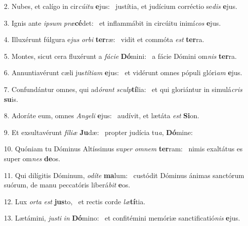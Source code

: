 2. Nubes, et calígo in cir\textit{cú}\textit{i}\textit{tu} \textbf{e}jus: \ast\  justítia, et judícium corréctio se\textit{dis} \textbf{e}jus.\

3. Ignis ante \textit{ip}\textit{sum} \textit{præ}\textbf{cé}det: \ast\  et inflammábit in circúitu inimí\textit{cos} \textbf{e}jus.\

4. Illuxérunt fúlgura e\textit{jus} \textit{or}\textit{bi} \textbf{ter}ræ: \ast\  vidit et commóta \textit{est} \textbf{ter}ra.\

5. Montes, sicut cera fluxérunt a \textit{fá}\textit{ci}\textit{e} \textbf{Dó}mini: \ast\  a fácie Dómini om\textit{nis} \textbf{ter}ra.\

6. Annuntiavérunt cæli jus\textit{tí}\textit{ti}\textit{am} \textbf{e}jus: \ast\  et vidérunt omnes pópuli glóri\textit{am} \textbf{e}jus.\

7. Confundántur omnes, qui ad\textit{ó}\textit{rant} \textit{sculp}\textbf{tí}lia: \ast\  et qui gloriántur in simulá\textit{cris} \textbf{su}is.\

8. Adoráte eum, omnes \textit{An}\textit{ge}\textit{li} \textbf{e}jus: \ast\  audívit, et lætáta \textit{est} \textbf{Si}on.\

9. Et exsultavérunt \textit{fí}\textit{li}\textit{æ} \textbf{Ju}dæ: \ast\  propter judícia tu\textit{a}, \textbf{Dó}mine:\

10. Quóniam tu Dóminus Altíssimus su\textit{per} \textit{om}\textit{nem} \textbf{ter}ram: \ast\  nimis exaltátus es super om\textit{nes} \textbf{de}os.\

11. Qui dilígitis Dóminum, \textit{o}\textit{dí}\textit{te} \textbf{ma}lum: \ast\  custódit Dóminus ánimas sanctórum suórum, de manu peccatóris liberá\textit{bit} \textbf{e}os.\

12. Lux \textit{or}\textit{ta} \textit{est} \textbf{jus}to, \ast\  et rectis corde \textit{læ}\textbf{tí}tia.\

13. Lætámini, \textit{jus}\textit{ti} \textit{in} \textbf{Dó}mino: \ast\  et confitémini memóriæ sanctificatió\textit{nis} \textbf{e}jus.\

